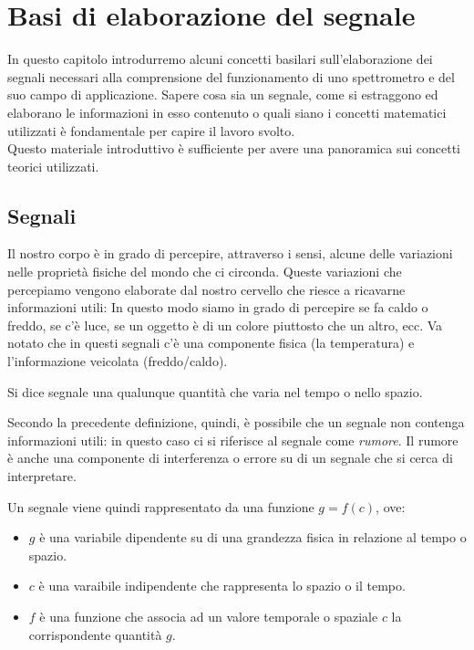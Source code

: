 \chapter{Basi di elaborazione del segnale}
\label{math_bkg}
In questo capitolo introdurremo alcuni concetti basilari sull'elaborazione dei
segnali necessari alla comprensione del funzionamento di uno
spettrometro e del suo campo di applicazione. Sapere cosa sia un segnale, come
si estraggono ed elaborano le informazioni in esso contenuto o quali siano i
concetti matematici utilizzati \`e fondamentale per capire il lavoro svolto.\\
Questo materiale introduttivo \`e sufficiente per avere una panoramica sui
concetti teorici utilizzati.

\section{Segnali}
Il nostro corpo \`e in grado di percepire, attraverso i sensi, alcune delle
variazioni nelle propriet\`a fisiche del mondo che ci circonda. Queste variazioni che percepiamo vengono
elaborate dal nostro cervello che riesce a ricavarne informazioni utili: In questo modo
siamo in grado di percepire se fa caldo o freddo, se c'\`e luce, se un oggetto
\`e di un colore piuttosto che un altro, ecc. Va notato che in questi segnali
c'\`e una componente fisica (la temperatura) e l'informazione veicolata
(freddo/caldo). \cite{bertoni}
\begin{definitions} \label{def:signal}
Si dice segnale una qualunque quantit\`a che varia nel tempo o nello spazio.
\end{definitions}
Secondo la precedente definizione, quindi, \`e possibile che un segnale non
contenga informazioni utili: in questo caso ci si riferisce al segnale come
\emph{rumore}. Il rumore \`e anche una componente di interferenza o errore su di
un segnale che si cerca di interpretare.

Un segnale viene quindi rappresentato da una funzione $g = f(c)$, ove:
\begin{itemize}
    \item $g$ \`e una variabile dipendente su di una grandezza fisica in
    relazione al tempo o spazio.
    \item $c$ \`e una varaibile indipendente che rappresenta lo spazio o il
    tempo.
    \item $f$ \`e una funzione che associa ad un valore temporale o spaziale $c$
    la corrispondente quantit\`a $g$.
\end{itemize}


